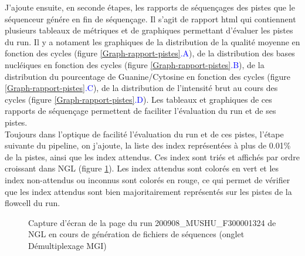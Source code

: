 J'ajoute ensuite, en seconde étapes, les rapports de séquençages des pistes que le séquenceur génére en fin de séquençage.
Il s'agit de rapport html qui contiennent plusieurs tableaux de métriques et de graphiques permettant d'évaluer les pistes du run.
Il y a notament les graphiques de la distribution de la qualité moyenne en fonction des cycles (figure \ref{Graph-rapport-pistes}\textcolor{blue}{.A}), de la distribution des bases nucléiques en fonction des cycles (figure \ref{Graph-rapport-pistes}\textcolor{blue}{.B}), de la distribution du pourcentage de Guanine/Cytosine en fonction des cycles (figure \ref{Graph-rapport-pistes}\textcolor{blue}{.C}), de la distribution de l'intensité brut au cours des cycles (figure \ref{Graph-rapport-pistes}\textcolor{blue}{.D}).
Les tableaux et graphiques de ces rapports de séquençage permettent de faciliter l'évaluation du run et de ses pistes.\\

Toujours dans l'optique de facilité l'évaluation du run et de ces pistes, l'étape suivante du pipeline, on j'ajoute, la liste des index représentées à plus de 0.01\% de la pistes, ainsi que les index attendus.
Ces index sont triés et affichés par ordre croissant dans NGL (figure \ref{top-index}).
Les index attendus sont colorés en vert et les index non-attendus ou inconnus sont colorés en rouge, ce qui permet de vérifier que les index attendus sont bien majoritairement représentés sur les pistes de la flowcell du run.

\begin{figure}[H]
    \centering
    \caption{\footnotesize{Capture d'écran de la page du run 200908\_MUSHU\_F300001324 de NGL en cours de génération de fichiers de séquences (onglet \og Démultiplexage MGI\fg{})}}
    \label{top-index}
\end{figure}

